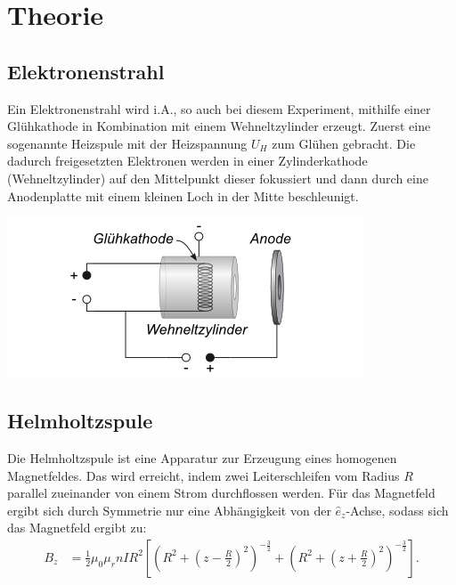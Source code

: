 \documentclass[12pt,a4paper]{article}
\renewcommand{\*}{\cdot}
\begin{document}
\section{Theorie}
\subsection{Elektronenstrahl}
Ein Elektronenstrahl wird i.A., so auch bei diesem Experiment, mithilfe einer Glühkathode in Kombination mit einem Wehneltzylinder
erzeugt.
Zuerst eine sogenannte Heizspule mit der Heizspannung $U_H$ zum Glühen gebracht. Die dadurch freigesetzten Elektronen werden in einer
Zylinderkathode (Wehneltzylinder) auf den Mittelpunkt dieser fokussiert und dann durch eine Anodenplatte mit einem kleinen Loch in 
der Mitte beschleunigt.
\begin{center}
\begin{minipage}{5cm}
\includegraphics{Elektronenkanone.png}
\end{minipage}
\end{center}

\subsection{Helmholtzspule}
Die Helmholtzspule ist eine Apparatur zur Erzeugung eines homogenen Magnetfeldes. Das wird erreicht, indem zwei Leiterschleifen vom 
Radius $R$ parallel zueinander von einem Strom durchflossen werden. Für das Magnetfeld ergibt sich durch Symmetrie nur eine Abhängigkeit
von der $\hat{e}_z$-Achse, sodass sich das Magnetfeld ergibt zu:
\begin{align}
B_{z} & = \frac{1}{2} \mu_{0} \mu_{r} n I R^2 \left[ \left( R^2+ \left( z - \frac{R}{2} \right)^2 \right)^{- \frac{3}{2}} + \left( R^2 + \left( z + \frac{R}{2} \right)^2 \right)^{- \frac{3}{2}} \right] \text{.} 
\end{align}
\end{document}
